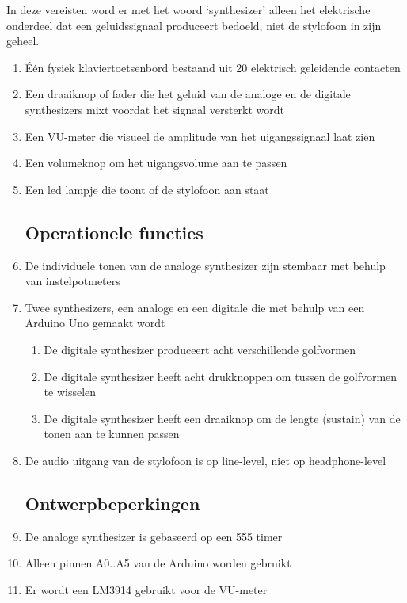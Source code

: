 \documentclass[12pt, a4paper, dutch]{article}
\begin{document}
In deze vereisten word er met het woord `synthesizer' alleen het elektrische
onderdeel dat een geluidssignaal produceert bedoeld, niet de stylofoon in zijn
geheel.

\begin{enumerate}
\subsection{Functionele specificaties}
	\item \label{req:20keys} \'E\'en fysiek klaviertoetsenbord bestaand uit 20
		elektrisch geleidende contacten
	\item \label{req:mixfader} Een draaiknop of fader die het geluid van de analoge en
		de digitale synthesizers mixt voordat het signaal versterkt wordt
	\item \label{req:vumeter} Een VU-meter die visueel de amplitude van het
		uigangssignaal laat zien
	\item \label{req:volknob} Een volumeknop om het uigangsvolume aan te passen
	\item \label{req:onled} Een led lampje die toont of de stylofoon aan staat
\subsection{Operationele functies}
	\item \label{req:tuneable} De individuele tonen van de analoge synthesizer zijn
		stembaar met behulp van instelpotmeters
	\item \label{req:engines} Twee synthesizers, een analoge en een digitale die met
		behulp van een Arduino Uno gemaakt wordt
	\begin{enumerate}
		\item \label{req:wavforms} De digitale synthesizer produceert acht verschillende
			golfvormen
		\item \label{req:wavswitch} De digitale synthesizer heeft acht drukknoppen om
			tussen de golfvormen te wisselen
		\item \label{req:sustain} De digitale synthesizer heeft een draaiknop om de
			lengte (sustain) van de tonen aan te kunnen passen
	\end{enumerate}
	\item \label{req:lineout} De audio uitgang van de stylofoon is op line-level, niet
		op headphone-level
\subsection{Ontwerpbeperkingen}
	\item \label{req:555} De analoge synthesizer is gebaseerd op een 555 timer
	\item \label{req:a05} Alleen pinnen A0..A5 van de Arduino worden gebruikt
	\item \label{req:lm3914} Er wordt een LM3914 gebruikt voor de VU-meter

\end{enumerate}
\end{document}

